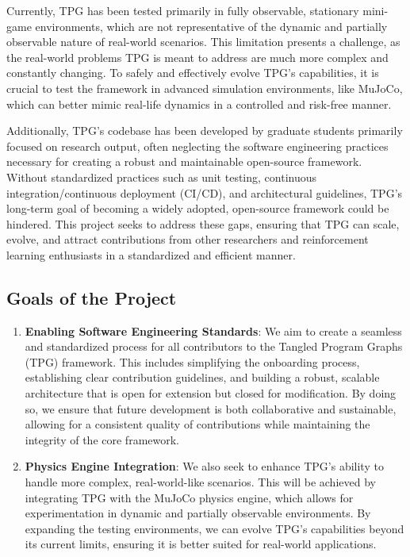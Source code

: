 \documentclass[12pt]{article}
\begin{document}
Currently, TPG has been tested primarily in fully observable, stationary mini-game environments, which are not representative of the dynamic and partially observable nature of real-world scenarios. This limitation presents a challenge, as the real-world problems TPG is meant to address are much more complex and constantly changing. To safely and effectively evolve TPG's capabilities, it is crucial to test the framework in advanced simulation environments, like MuJoCo, which can better mimic real-life dynamics in a controlled and risk-free manner.

Additionally, TPG's codebase has been developed by graduate students primarily focused on research output, often neglecting the software engineering practices necessary for creating a robust and maintainable open-source framework. Without standardized practices such as unit testing, continuous integration/continuous deployment (CI/CD), and architectural guidelines, TPG's long-term goal of becoming a widely adopted, open-source framework could be hindered. This project seeks to address these gaps, ensuring that TPG can scale, evolve, and attract contributions from other researchers and reinforcement learning enthusiasts in a standardized and efficient manner.
\subsection{Goals of the Project}

\begin{enumerate}
  \item \textbf{Enabling Software Engineering Standards}: We aim to create a seamless and standardized process for all contributors to the Tangled Program Graphs (TPG) framework. This includes simplifying the onboarding process, establishing clear contribution guidelines, and building a robust, scalable architecture that is open for extension but closed for modification. By doing so, we ensure that future development is both collaborative and sustainable, allowing for a consistent quality of contributions while maintaining the integrity of the core framework.
  \item \textbf{Physics Engine Integration}: We also seek to enhance TPG's ability to handle more complex, real-world-like scenarios. This will be achieved by integrating TPG with the MuJoCo physics engine, which allows for experimentation in dynamic and partially observable environments. By expanding the testing environments, we can evolve TPG's capabilities beyond its current limits, ensuring it is better suited for real-world applications.
\end{enumerate}
\end{document}
